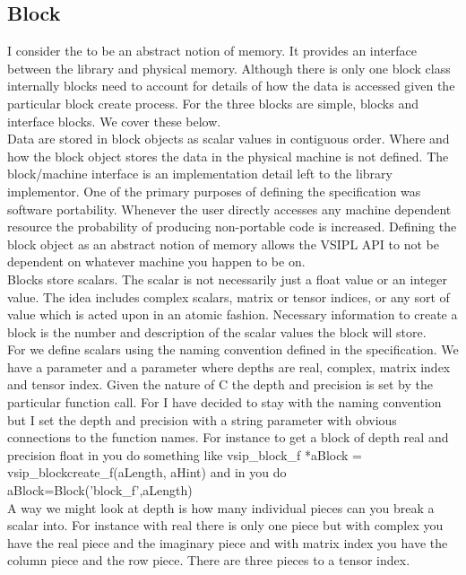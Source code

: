 \subsection{Block}
I consider the \blk{} to be an abstract notion of memory. It provides an interface between the library and  physical memory.  Although there is only one block class internally blocks need to account for details of how the data is accessed given the particular block create process. For \cvl{} the three blocks are simple{},  blocks and interface blocks.  We cover these below. 
\\[6pt]
Data are stored in block objects as scalar values in contiguous order. Where and how the block object stores the data in the physical machine is not defined. The block/machine interface is an implementation detail left to the library implementor.  One of the primary purposes of defining the \cvl{} specification was software portability. Whenever the user directly accesses any machine dependent resource the probability of producing non-portable code is increased. Defining the block object as an abstract notion of memory allows the VSIPL API to not be dependent on whatever machine you happen to be on.  
\\[6pt]
Blocks store scalars.  The scalar is not necessarily just a float value or an integer value.  The idea includes complex scalars, matrix or tensor indices, or any sort of value which is acted upon in an atomic fashion. Necessary information to create a block is the number and description of the scalar values the block will store.
\\[6pt]
For \cvl{} we define scalars using the naming convention defined in the specification. We have a   parameter and a  parameter where depths are real, complex, matrix index and tensor index. Given the nature of C the depth and precision is set by the particular function call. For \pyjv{} I have decided to stay with the naming convention but I set the depth and precision with a string parameter with obvious connections to the \cvl{} function names. For instance to get a block of depth real and precision float in \cvl{} you do something like
vsip\_block\_f *aBlock = vsip\_blockcreate\_f(aLength, aHint)
and in \pyjv{} you do
aBlock=Block('block\_f',aLength)
\\[6pt]
A way we might look at depth is how many individual pieces can you break a scalar into. For instance with real there is only one piece but with complex you have the real piece and the imaginary piece and with matrix index you have the column piece and the row piece. There are three pieces to a tensor index. 
